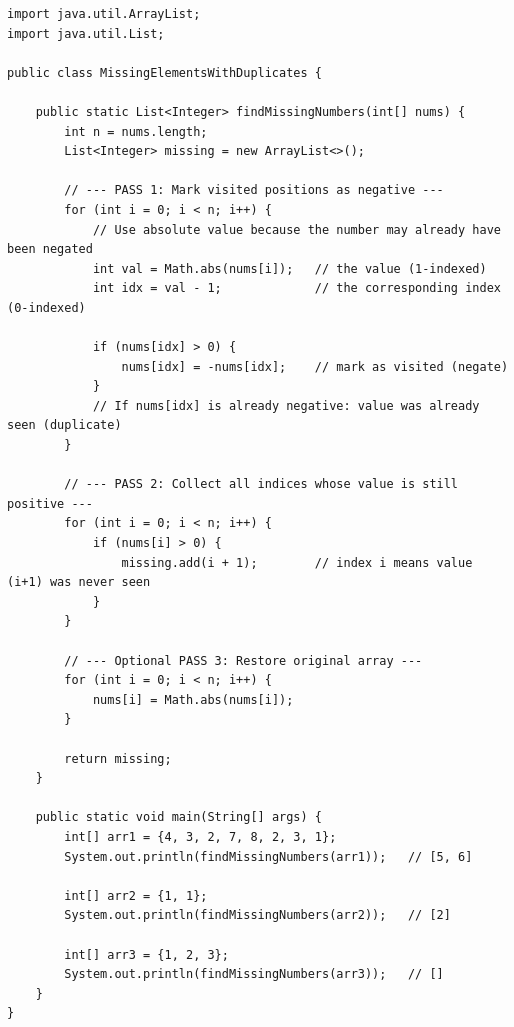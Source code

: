 \documentclass[12pt,a4paper,oneside]{book}
\begin{document}
\begin{lstlisting}[caption={Missing Elements With Duplicates --- Negative Marking, O(n) time O(1) space}]
import java.util.ArrayList;
import java.util.List;

public class MissingElementsWithDuplicates {

    public static List<Integer> findMissingNumbers(int[] nums) {
        int n = nums.length;
        List<Integer> missing = new ArrayList<>();

        // --- PASS 1: Mark visited positions as negative ---
        for (int i = 0; i < n; i++) {
            // Use absolute value because the number may already have been negated
            int val = Math.abs(nums[i]);   // the value (1-indexed)
            int idx = val - 1;             // the corresponding index (0-indexed)

            if (nums[idx] > 0) {
                nums[idx] = -nums[idx];    // mark as visited (negate)
            }
            // If nums[idx] is already negative: value was already seen (duplicate)
        }

        // --- PASS 2: Collect all indices whose value is still positive ---
        for (int i = 0; i < n; i++) {
            if (nums[i] > 0) {
                missing.add(i + 1);        // index i means value (i+1) was never seen
            }
        }

        // --- Optional PASS 3: Restore original array ---
        for (int i = 0; i < n; i++) {
            nums[i] = Math.abs(nums[i]);
        }

        return missing;
    }

    public static void main(String[] args) {
        int[] arr1 = {4, 3, 2, 7, 8, 2, 3, 1};
        System.out.println(findMissingNumbers(arr1));   // [5, 6]

        int[] arr2 = {1, 1};
        System.out.println(findMissingNumbers(arr2));   // [2]

        int[] arr3 = {1, 2, 3};
        System.out.println(findMissingNumbers(arr3));   // []
    }
}
\end{lstlisting}
\end{document}
